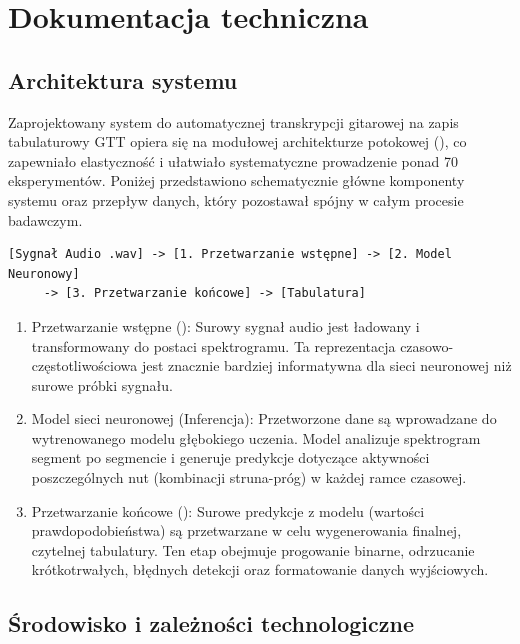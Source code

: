 \chapter{Dokumentacja techniczna}
\label{chap:dokumentacja_techniczna}

\section*{Architektura systemu}
\label{sec:tech_architektura}

Zaprojektowany system do automatycznej transkrypcji gitarowej na zapis tabulaturowy GTT opiera się na modułowej architekturze potokowej (), co zapewniało elastyczność i ułatwiało systematyczne prowadzenie ponad 70 eksperymentów. Poniżej przedstawiono schematycznie główne komponenty systemu oraz przepływ danych, który pozostawał spójny w całym procesie badawczym.

\begin{verbatim}
[Sygnał Audio .wav] -> [1. Przetwarzanie wstępne] -> [2. Model Neuronowy]
     -> [3. Przetwarzanie końcowe] -> [Tabulatura]
\end{verbatim}

\begin{enumerate}
    \item Przetwarzanie wstępne (): Surowy sygnał audio jest ładowany i transformowany do postaci spektrogramu. Ta reprezentacja czasowo-częstotliwościowa jest znacznie bardziej informatywna dla sieci neuronowej niż surowe próbki sygnału.

    \item Model sieci neuronowej (Inferencja): Przetworzone dane są wprowadzane do wytrenowanego modelu głębokiego uczenia. Model analizuje spektrogram segment po segmencie i generuje predykcje dotyczące aktywności poszczególnych nut (kombinacji struna-próg) w każdej ramce czasowej.

    \item Przetwarzanie końcowe (): Surowe predykcje z modelu (wartości prawdopodobieństwa) są przetwarzane w celu wygenerowania finalnej, czytelnej tabulatury. Ten etap obejmuje progowanie binarne, odrzucanie krótkotrwałych, błędnych detekcji oraz formatowanie danych wyjściowych.
\end{enumerate}

\section*{Środowisko i zależności technologiczne}
\label{sec:tech_srodowisko}

